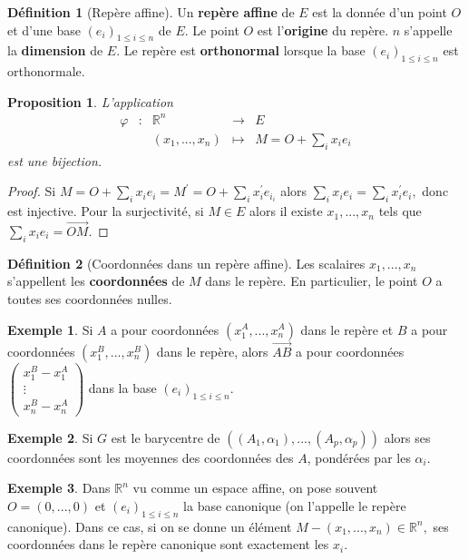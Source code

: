 \documentclass[french]{book}
\theoremstyle{plain}
\newtheorem{prop}{Proposition}[chapter]
\theoremstyle{definition}
\newtheorem{dfn}{Définition}[chapter]
\newtheorem{exa}{Exemple}[chapter]
\theoremstyle{remark}
\begin{document}
\begin{dfn}[Repère affine]
	Un \textbf{repère affine} de $E$ est la donnée d'un point $O$ et d'une
base $(e_{i})_{1\le i\le n}$ de $E$. Le point $O$ est l'\textbf{origine} du repère. $n$ s'appelle la \textbf{dimension} de $E$. Le repère est \textbf{orthonormal} lorsque la base $(e_{i})_{1\le i\le n}$ est orthonormale.
\end{dfn}
\begin{prop}
	L'application 
	$$\begin{array}{ccccc}
	\varphi&:&\mathbb{R}^{n}&\longrightarrow& E \\
	&&(x_{1},...,x_{n}) &\longmapsto& M = O + \displaystyle\sum_{i}x_{i}e_{i}
	\end{array}$$
est une bijection.
\end{prop}
\begin{proof}
	Si $\displaystyle M = O + \sum_{i}x_{i}e_{i} = M^{\prime} = O + \sum_{i}x_{i}^{\prime}e_{i_{i}}$ alors $\displaystyle\sum_{i}x_{i}e_{i}=\sum_{i}x_{i}^{\prime}e_{i},$ donc est injective. Pour la surjectivité, si $M\in E$ alors il existe $x_{1},...,x_{n}$ tels que $\displaystyle\sum_{i}x_{i}e_{i}=\overrightarrow{OM}$.
\end{proof}
\begin{dfn}[Coordonnées dans un repère affine]
	Les scalaires $x_{1},...,x_{n}$ s'appellent les \textbf{coordonnées} de $M$ dans le repère. En particulier, le point $O$ a toutes ses coordonnées nulles.
\end{dfn}
\begin{exa}
	Si $A$ a pour coordonnées $(x_{1}^{A},...,x_{n}^{A})$ dans le repère et $B$ a pour coordonnées $(x_{1}^{B},...,x_{n}^{B})$ dans le repère, alors $\overrightarrow{AB}$ a pour coordonnées $\displaystyle\begin{pmatrix}x_{1}^{B}-x_{1}^{A}\\ \vdots\\ x_{n}^{B}-x_{n}^{A}\end{pmatrix}$ dans la base $(e_{i})_{1\le i\le n}$.
\end{exa}
\begin{exa}
	Si $G$ est le barycentre de $((A_{1},\alpha_{1}),...,(A_{p},\alpha_{p}))$ alors ses coordonnées sont les moyennes des coordonnées des $A$, pondérées par les $\alpha_{i}$.
\end{exa}
\begin{exa}
	Dans $\mathbb{R}^{n}$ vu comme un espace affine, on pose souvent $O=(0,...,0)$ et
$(e_{i})_{1\le i\le n}$ la base canonique (on l'appelle le repère canonique). Dans ce cas, si on se donne un élément $M-(x_{1},...,x_{n})\in\mathbb{R}^{n},$ ses coordonnées dans le repère canonique sont exactement les $x_{i}$.
\end{exa}
\end{document}
